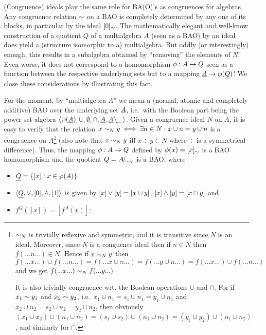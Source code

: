 \documentclass[10pt]{article}
\begin{document}
\noindent
(Congruence) ideals play the same role for BA(O)'s as congruences for
algebras. Any congruence relation $\sim$ on a BAO is completely
determined by any one of its blocks, in particular by the ideal
$[0]_\sim$.  The mathematically elegant and well-know construction
of a quotient $Q$ of a multialgebra $A$ (seen as a BAO) by an ideal
does yield a (structure isomorphic to a) multialgebra.  But oddly (or
interestingly) enough, this results in a subalgebra obtained by
``removing'' the elements of $N$!  Even worse, it does not correspond
to a homomorphism $\phi:A\rightarrow Q$ seen as a function between the
respective underlying sets but to a mapping $\underline {A}\rightarrow
\wp(\underline {Q})$!  We close these considerations by illustrating this
fact.

For the moment, by ``multialgebra $A$'' we mean a (normal, atomic and
completely additive) BAO over the underlying set $\underline {A}$, i.e.\
with the Boolean part being the power set algebra $\langle\wp(\underline {A}),\cup,\emptyset,\cap,\underline {A}, \underline {A}\!\setminus\!\!\_\,\rangle$.  Given a
congruence ideal $N$ on $A$, it is easy to verify that the relation
$x\sim_N y \iff \exists n\in N: x\cup n= y\cup n$ is a congruence on
$A$\footnote{$\sim_N$ is trivially reflexive and symmetric, and it
is transitive since $N$ is an ideal. Moreover, since $N$ is a
conguence ideal then if $n \in N$ then $f(...n...) \in N$. Hence if
$x\sim_N y$ then $f(...x...)\cup f(...n...) = f(...x\cup n...) =  
f(...y\cup n...) = f(...x...)\cup f(...n...)$ and we get $f(...x...)
\sim_N f(...y...)$

It is also trivially congruence wrt. the Boolean operations $\cup$ and
$\cap$. For if $x_1\sim y_1$ and $x_2\sim y_2$, i.e.\ $x_1\cup
n_1=s_1\cup n_1=y_1\cup n_1$ and $x_2\cup n_2=s_2\cup n_2=y_2\cup
n_2$, then obviously $(x_1\cup x_2)\cup (n_1\cup n_2)=(s_1\cup
s_2)\cup (n_1\cup n_2)= (y_1\cup y_2)\cup (n_1\cup n_2)$, and
similarly for $\cap$.}
%
(also note that $x\sim_N y$ iff $x\div y \in N$ where $\div$ is a
symmetrical difference). Thus, the mapping $\phi:A\rightarrow Q$ defined by
$\phi(x)= [x]_\sim$ is a BAO homomorphism and the quotient $Q=A\!{\textstyle /}\!_{{\sim_{N}}}$ is a BAO, where
%
\begin{itemize}\MyLPar
\item 
$\underline {Q}=\{[x]:x\in \wp(\underline {A})\}$ 
\item 
$\langle\underline {Q},\lor,[0],\land,[1]\rangle$ is given by
$[x]\lor [y] = [x\cup y]$, $[x]\land[y]=[x\cap y]$ and 
\item 
$f^Q([x])=[f^A(x)]$;
\end{itemize}
\end{document}
